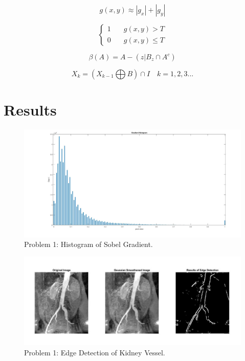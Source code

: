 \documentclass[./rarnold_project_89.tex]{subfiles}
\begin{document}
\begin{equation}
g(x,y) \approx |g_x| + |g_y|
\label{gradient}
\end{equation}

\begin{equation}
\left\{
\begin{array}{ll}
	1 & \quad g(x,y) > T	\\
	0 & \quad g(x,y) \leq T
\end{array}
\right.
\label{thresh}
\end{equation}

\begin{equation}
\beta (A) = A - (z|B_z \cap A^{c})
\label{boundary}
\end{equation}

\begin{equation}
X_k = (X_{k-1} \bigoplus B) \cap I \quad k=1,2,3...
\label{conn}
\end{equation}



\clearpage

\section*{Results}

	\begin{figure}[!htbp]
	\centering
	\includegraphics[scale=0.35]{"gradient_hist"}
	\captionsetup{justification=centering}
	\caption{Problem 1: Histogram of Sobel Gradient.} 
	\label{p1hist}
	\end{figure}
	
	\begin{figure}[!htbp]
	\centering
	\includegraphics[scale=0.55]{"problem1"}
	\captionsetup{justification=centering}
	\caption{Problem 1: Edge Detection of Kidney Vessel.} 
	\label{p1}
	\end{figure}
	
\end{document}
